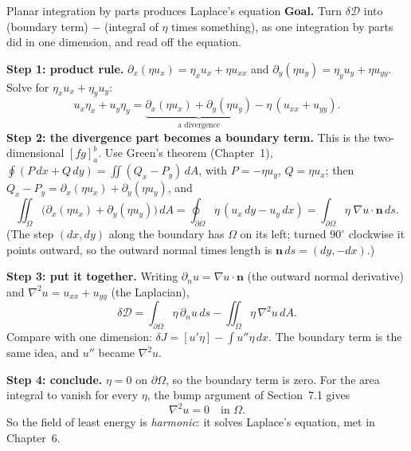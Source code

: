\documentclass[11pt]{beamer}
\newcommand{\dd}{\,d}
\newcommand{\D}{\mathcal D}
\begin{document}
\begin{frame}[allowframebreaks=1.00]{Planar integration by parts produces Laplace's equation}
\small
\textbf{Goal.} Turn \(\delta\D\) into (boundary term) \(-\) (integral of \(\eta\) times something), as one integration
by parts did in one dimension, and read off the equation.

\textbf{Step 1: product rule.} \(\partial_x(\eta u_x)=\eta_xu_x+\eta u_{xx}\) and \(\partial_y(\eta u_y)=\eta_yu_y+\eta u_{yy}\). Solve
for \(\eta_xu_x+\eta_yu_y\):
\[
 u_x\eta_x+u_y\eta_y
 =\underbrace{\partial_x(\eta u_x)+\partial_y(\eta u_y)}_{\text{a divergence}}-\eta\,(u_{xx}+u_{yy}).
\]
\textbf{Step 2: the divergence part becomes a boundary term.} This is the two-dimensional
\([fg]_a^b\). Use Green's theorem (Chapter~1), \(\oint(P\dd x+Q\dd y)=\iint(Q_x-P_y)\dd A\), with \(P=-\eta u_y\),
\(Q=\eta u_x\); then \(Q_x-P_y=\partial_x(\eta u_x)+\partial_y(\eta u_y)\), and
\[
 \iint_\Omega\big(\partial_x(\eta u_x)+\partial_y(\eta u_y)\big)\dd A
 =\oint_{\partial\Omega}\eta\,(u_x\dd y-u_y\dd x)
 =\int_{\partial\Omega}\eta\;\nabla u\cdot\mathbf n\dd s .
\]
(The step \((dx,dy)\) along the boundary has \(\Omega\) on its left; turned \(90^\circ\) clockwise it
points outward, so the outward normal times length is \(\mathbf n\dd s=(dy,-dx)\).)
\par\framebreak\par
\textbf{Step 3: put it together.} Writing \(\partial_nu=\nabla u\cdot\mathbf n\) (the outward normal derivative) and
\(\nabla^2 u=u_{xx}+u_{yy}\) (the Laplacian),
\begin{equation}
 \delta\D=\int_{\partial\Omega}\eta\,\partial_nu\dd s
            -\iint_\Omega\eta\,\nabla^2 u\dd A.\label{eq:planar-first}
\end{equation}
Compare with one dimension: \(\delta J=[u'\eta]-\int u''\eta\,dx\). The boundary term is the same idea, and \(u''\)
became \(\nabla^2 u\).

\textbf{Step 4: conclude.} \(\eta=0\) on \(\partial\Omega\), so the boundary term is zero. For the area integral to vanish
for every \(\eta\), the bump argument of Section~7.1 gives
\begin{equation}
 \nabla^2 u=0\quad\text{in }\Omega.\label{eq:laplace}
\end{equation}
So the field of least energy is \emph{harmonic}: it solves Laplace's equation, met in Chapter~6.
\end{frame}
\end{document}
